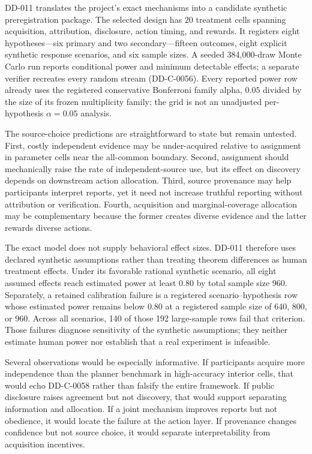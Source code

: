 \documentclass[11pt]{article}
\begin{document}
DD-011 translates the project's exact mechanisms into a candidate synthetic preregistration package.
The selected design has 20 treatment cells spanning
acquisition, attribution, disclosure, action timing, and rewards. It registers
eight hypotheses---six primary and two secondary---fifteen outcomes, eight
explicit synthetic response scenarios, and six sample sizes. A seeded
384,000-draw Monte Carlo run reports conditional power
and minimum detectable effects; a separate verifier recreates every random
stream (DD-C-0056). Every reported power row already uses the registered conservative Bonferroni family alpha, $0.05$ divided by the size of its frozen
multiplicity family; the grid is not an unadjusted per-hypothesis
$\alpha=0.05$ analysis.



The source-choice predictions are straightforward to state but remain untested.
First, costly independent evidence may be under-acquired relative to assignment
in parameter cells near the all-common boundary. Second, assignment should
mechanically raise the rate of independent-source use, but its effect on
discovery depends on downstream action allocation. Third, source provenance may
help participants interpret reports, yet it need not increase truthful reporting
without attribution or verification. Fourth, acquisition and marginal-coverage
allocation may be complementary because the former creates diverse evidence and
the latter rewards diverse actions.

The exact model does not supply behavioral effect sizes. DD-011 therefore uses
declared synthetic assumptions rather than treating theorem differences as human
treatment effects. Under its favorable rational synthetic scenario, all eight
assumed effects reach estimated power at least $0.80$ by total sample size 960.
Separately, a retained calibration failure is a registered
scenario--hypothesis row whose estimated power remains below $0.80$ at a
registered sample size of 640, 800, or 960. Across all scenarios, 140 of those
192 large-sample rows fail that criterion. Those failures diagnose sensitivity
of the synthetic assumptions; they neither estimate human power nor establish
that a real experiment is infeasible.

Several observations would be especially informative. If participants acquire
more independence than the planner benchmark in high-accuracy interior cells,
that would echo DD-C-0058 rather than falsify the entire framework. If public
disclosure raises agreement but not discovery, that would support separating
information and allocation. If a joint mechanism improves reports but not
obedience, it would locate the failure at the action layer. If provenance changes
confidence but not source choice, it would separate interpretability from
acquisition incentives.
\end{document}
